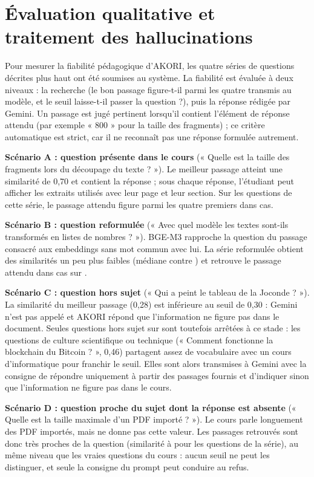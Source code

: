 \documentclass[12pt,a4paper,oneside]{report}
\begin{document}
\section{Évaluation qualitative et traitement des hallucinations}

Pour mesurer la fiabilité pédagogique d'AKORI, les quatre séries de questions décrites plus haut ont été soumises au système. La fiabilité est évaluée à deux niveaux : la recherche (le bon passage figure-t-il parmi les quatre transmis au modèle, et le seuil laisse-t-il passer la question ?), puis la réponse rédigée par Gemini. Un passage est jugé pertinent lorsqu'il contient l'élément de réponse attendu (par exemple « 800 » pour la taille des fragments) ; ce critère automatique est strict, car il ne reconnaît pas une réponse formulée autrement.

\textbf{Scénario A : question présente dans le cours} (« Quelle est la taille des fragments lors du découpage du texte ? »). Le meilleur passage atteint une similarité de 0,70 et contient la réponse ; sous chaque réponse, l'étudiant peut afficher les extraits utilisés avec leur page et leur section. Sur les \SeuilCoursN{} questions de cette série, le passage attendu figure parmi les quatre premiers dans \SeuilCoursRappel{} cas.

\textbf{Scénario B : question reformulée} (« Avec quel modèle les textes sont-ils transformés en listes de nombres ? »). BGE-M3 rapproche la question du passage consacré aux embeddings sans mot commun avec lui. La série reformulée obtient des similarités un peu plus faibles (médiane \SeuilRefoMed{} contre \SeuilCoursMed{}) et retrouve le passage attendu dans \SeuilRefoRappel{} cas sur \SeuilRefoN{}.

\textbf{Scénario C : question hors sujet} (« Qui a peint le tableau de la Joconde ? »). La similarité du meilleur passage (0,28) est inférieure au seuil de 0,30 : Gemini n'est pas appelé et AKORI répond que l'information ne figure pas dans le document. Seules \SeuilHorsRefus{} questions hors sujet sur \SeuilHorsN{} sont toutefois arrêtées à ce stade : les questions de culture scientifique ou technique (« Comment fonctionne la blockchain du Bitcoin ? », 0,46) partagent assez de vocabulaire avec un cours d'informatique pour franchir le seuil. Elles sont alors transmises à Gemini avec la consigne de répondre uniquement à partir des passages fournis et d'indiquer sinon que l'information ne figure pas dans le cours.

\textbf{Scénario D : question proche du sujet dont la réponse est absente} (« Quelle est la taille maximale d'un PDF importé ? »). Le cours parle longuement des PDF importés, mais ne donne pas cette valeur. Les passages retrouvés sont donc très proches de la question (similarité \SeuilAbsMin{} à \SeuilAbsMax{} pour les \SeuilAbsN{} questions de la série), au même niveau que les vraies questions du cours : aucun seuil ne peut les distinguer, et seule la consigne du prompt peut conduire au refus.
\end{document}
